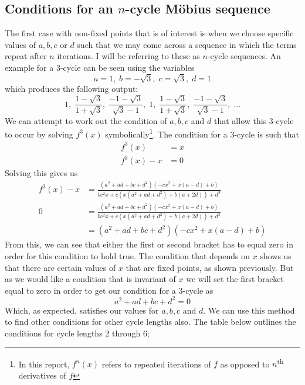 \documentclass[12pt]{article}
\begin{document}
\subsection{Conditions for an $n$-cycle Möbius sequence}\label{sec:mobCycles}
The first case with non-fixed points that is of interest is when we choose specific values of $a, b, c$ or $d$ such that we may come across a sequence in which the terms repeat after $n$ iterations. I will be referring to these as $n$-cycle sequences. An example for a $3$-cycle can be seen using the variables 
	\[a=1,\; b=-\sqrt{3},\; c=\sqrt{3},\; d=1\]
which produces the following output:
	\[1,\; \frac{1-\sqrt{3}}{1+\sqrt{3}},\; \frac{-1-\sqrt{3}}{\sqrt{3}-1},\; 1,\; \frac{1-\sqrt{3}}{1+\sqrt{3}},\; \frac{-1-\sqrt{3}}{\sqrt{3}-1},\; \dots\]\label{seqout}
We can attempt to work out the condition of $a, b, c$ and $d$ that allow this $3$-cycle to occur by solving $f^3(x)$ symbolically\footnote{In this report, $f^n(x)$ refers to repeated iterations of $f$ as opposed to $n$\textsuperscript{th} derivatives of $f$}. The condition for a $3$-cycle is such that 
	\begin{equation*}
		\begin{split}
			f^3(x)   & =x \\[5pt]
			f^3(x)-x & =0
		\end{split}
	\end{equation*} 
Solving this gives us 
	\begin{equation*}
		\begin{split}
			f^3(x)-x & =\frac{(a^2+ad+bc+d^2)(-cx^2+x(a-d)+b)}{bc^2x+c(x(a^2+ad+d^2)+b(a+2d))+d^3} \\[5pt]
			0        & =\frac{(a^2+ad+bc+d^2)(-cx^2+x(a-d)+b)}{bc^2x+c(x(a^2+ad+d^2)+b(a+2d))+d^3} \\[5pt]
			         & =(a^2+ad+bc+d^2)(-cx^2+x(a-d)+b)
		\end{split}
	\end{equation*}
From this, we can see that either the first or second bracket has to equal zero in order for this condition to hold true. The condition that depends on $x$ shows us that there are certain values of $x$ that are fixed points, as shown previously. But as we would like a condition that is invariant of $x$ we will set the first bracket equal to zero in order to get our condition for a 3-cycle as
	\[a^2+ad+bc+d^2=0\]
Which, as expected, satisfies our values for $a, b, c$ and $d$.
We can use this method to find other conditions for other cycle lengths also. The table below outlines the conditions for cycle lengths 2 through 6;
\end{document}
